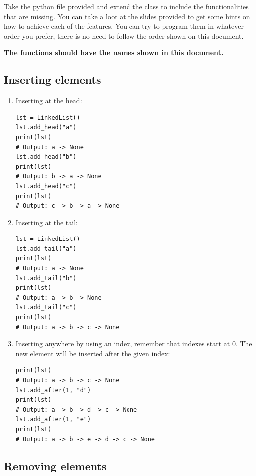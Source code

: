 \documentclass[10pt,a4paper]{article}
\begin{document}
Take the python file provided and extend the class to include the functionalities that are missing.
You can take a loot at the slides provided to get some hints on how to achieve each of the features.
You can try to program them in whatever order you prefer, there is no need to follow the order shown on this document.

\textbf{The functions should have the names shown in this document.}

\newpage
\subsection*{Inserting elements}

\begin{enumerate}
	\item Inserting at the head:
\begin{lstlisting}
lst = LinkedList()
lst.add_head("a")
print(lst)
# Output: a -> None
lst.add_head("b")
print(lst)
# Output: b -> a -> None
lst.add_head("c")
print(lst)
# Output: c -> b -> a -> None
\end{lstlisting}
	\item Inserting at the tail:
\begin{lstlisting}
lst = LinkedList()
lst.add_tail("a")
print(lst)
# Output: a -> None
lst.add_tail("b")
print(lst)
# Output: a -> b -> None
lst.add_tail("c")
print(lst)
# Output: a -> b -> c -> None
\end{lstlisting}
	\item Inserting anywhere by using an index, remember that indexes start at 0. The new element will be inserted after the given index:
\begin{lstlisting}
print(lst)
# Output: a -> b -> c -> None
lst.add_after(1, "d")
print(lst)
# Output: a -> b -> d -> c -> None
lst.add_after(1, "e")
print(lst)
# Output: a -> b -> e -> d -> c -> None
\end{lstlisting}
\end{enumerate}

\newpage

\subsection*{Removing elements}
\end{document}
